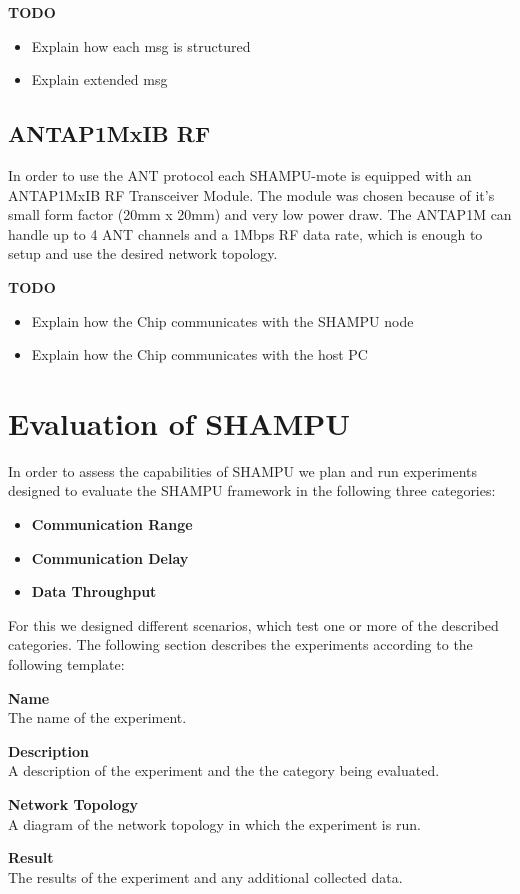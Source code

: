 \textbf{TODO}
\begin{itemize}
	\item{Explain how each msg is structured}
	\item{Explain extended msg }
\end{itemize}

\section{ANTAP1MxIB RF}
In order to use the ANT protocol each SHAMPU-mote is equipped with an ANTAP1MxIB RF Transceiver Module. The module was chosen because of it's small form factor (20mm x 20mm) and very low power draw. The ANTAP1M can handle up to 4 ANT channels and a 1Mbps RF data rate, which is enough to setup and use the desired network topology.

\textbf{TODO}
\begin{itemize}
	\item{Explain how the Chip communicates with the SHAMPU node}
	\item{Explain how the Chip communicates with the host PC}
\end{itemize}

\chapter{Evaluation of SHAMPU}
In order to assess the capabilities of SHAMPU we plan and run experiments designed to evaluate the SHAMPU framework in the following three categories:
\begin{itemize}
	\item{\textbf{Communication Range}} 
	\item{\textbf{Communication Delay}} 
	\item{\textbf{Data Throughput}} 
\end{itemize}

For this we designed different scenarios, which test one or more of the described categories. The following section describes the experiments according to the following template:

\begin{description}
\item{\textbf{Name}} \hfill \\ The name of the experiment.
\item{\textbf{Description}} \hfill \\ A description of the experiment and the the category being evaluated.
\item{\textbf{Network Topology}} \hfill \\ A diagram of the network topology in which the experiment is run.
\item{\textbf{Result}} \hfill \\ The results of the experiment and any additional collected data.
\end{description}


